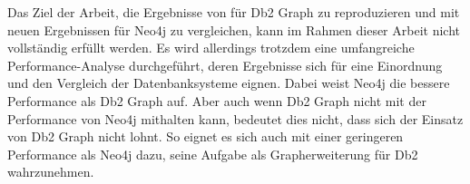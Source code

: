 Das Ziel der Arbeit, die Ergebnisse von  für Db2 Graph zu reproduzieren und mit neuen Ergebnissen für Neo4j zu vergleichen, kann im Rahmen dieser Arbeit nicht vollständig erfüllt werden. Es wird allerdings trotzdem eine umfangreiche Performance-Analyse durchgeführt, deren Ergebnisse sich für eine Einordnung und den Vergleich der Datenbanksysteme eignen. Dabei weist Neo4j die bessere Performance als Db2 Graph auf. Aber auch wenn Db2 Graph nicht mit der Performance von Neo4j mithalten kann, bedeutet dies nicht, dass sich der Einsatz von Db2 Graph nicht lohnt. So eignet es sich auch mit einer geringeren Performance als Neo4j dazu, seine Aufgabe als Grapherweiterung für Db2 wahrzunehmen.